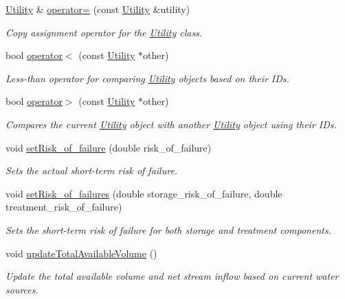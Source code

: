 \begin{DoxyCompactItemize}
\mbox{\hyperlink{classUtility}{Utility}} \& \mbox{\hyperlink{classUtility_a9a362d68a5aa3ec934c286f3a7e9b721}{operator=}} (const \mbox{\hyperlink{classUtility}{Utility}} \&utility)
\begin{DoxyCompactList}\small\item\em Copy assignment operator for the \mbox{\hyperlink{classUtility}{Utility}} class. \end{DoxyCompactList}\item 
bool \mbox{\hyperlink{classUtility_ae2dad8029e34c5bb073a5ddf4381d278}{operator$<$}} (const \mbox{\hyperlink{classUtility}{Utility}} $\ast$other)
\begin{DoxyCompactList}\small\item\em Less-\/than operator for comparing \mbox{\hyperlink{classUtility}{Utility}} objects based on their I\+Ds. \end{DoxyCompactList}\item 
bool \mbox{\hyperlink{classUtility_a222897e8c338fde0d754df4683fbc89b}{operator$>$}} (const \mbox{\hyperlink{classUtility}{Utility}} $\ast$other)
\begin{DoxyCompactList}\small\item\em Compares the current \mbox{\hyperlink{classUtility}{Utility}} object with another \mbox{\hyperlink{classUtility}{Utility}} object using their I\+Ds. \end{DoxyCompactList}\item 
void \mbox{\hyperlink{classUtility_a68d5088951f6bdccbb7af18ea8f153f5}{set\+Risk\+\_\+of\+\_\+failure}} (double risk\+\_\+of\+\_\+failure)
\begin{DoxyCompactList}\small\item\em Sets the actual short-\/term risk of failure. \end{DoxyCompactList}\item 
void \mbox{\hyperlink{classUtility_aadf42161486c8305b0b55aa65c5f519e}{set\+Risk\+\_\+of\+\_\+failures}} (double storage\+\_\+risk\+\_\+of\+\_\+failure, double treatment\+\_\+risk\+\_\+of\+\_\+failure)
\begin{DoxyCompactList}\small\item\em Sets the short-\/term risk of failure for both storage and treatment components. \end{DoxyCompactList}\item 
void \mbox{\hyperlink{classUtility_af394fe9f04a371a7cf10ddadba575e85}{update\+Total\+Available\+Volume}} ()
\begin{DoxyCompactList}\small\item\em Update the total available volume and net stream inflow based on current water sources. \end{DoxyCompactList}\item 

\end{DoxyCompactItemize}
